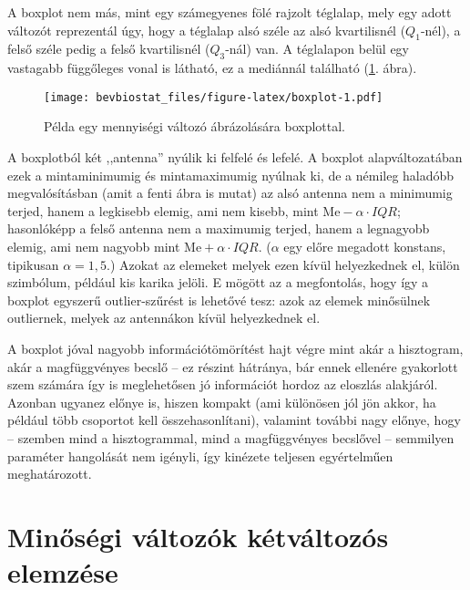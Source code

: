\documentclass[]{book}
\newenvironment{Shaded}{\begin{snugshade}}{\end{snugshade}}
\newcommand{\KeywordTok}[1]{\textcolor[rgb]{0.13,0.29,0.53}{\textbf{#1}}}
\newcommand{\OperatorTok}[1]{\textcolor[rgb]{0.81,0.36,0.00}{\textbf{#1}}}
\newcommand{\NormalTok}[1]{#1}
\begin{document}
A boxplot nem más, mint egy számegyenes fölé rajzolt téglalap, mely egy
adott változót reprezentál úgy, hogy a téglalap alsó széle az alsó
kvartilisnél (\(Q_1\)-nél), a felső széle pedig a felső kvartilisnél
(\(Q_3\)-nál) van. A téglalapon belül egy vastagabb függőleges vonal is
látható, ez a mediánnál található (\ref{fig:boxplot}. ábra).

\begin{Shaded}
\end{Shaded}

\begin{figure}
\centering
\texttt{[image: bevbiostat\_files/figure-latex/boxplot-1.pdf]}
\caption{\label{fig:boxplot}Példa egy mennyiségi változó ábrázolására
boxplottal.}
\end{figure}

A boxplotból két ,,antenna'' nyúlik ki felfelé és lefelé. A boxplot
alapváltozatában ezek a mintaminimumig és mintamaximumig nyúlnak ki, de
a némileg haladóbb megvalósításban (amit a fenti ábra is mutat) az alsó
antenna nem a minimumig terjed, hanem a legkisebb elemig, ami nem
kisebb, mint \(\mathrm{Me}-\alpha \cdot IQR\); hasonlóképp a felső
antenna nem a maximumig terjed, hanem a legnagyobb elemig, ami nem
nagyobb mint \(\mathrm{Me}+\alpha \cdot IQR\). (\(\alpha\) egy előre
megadott konstans, tipikusan \(\alpha=1,\!5\).) Azokat az elemeket
melyek ezen kívül helyezkednek el, külön szimbólum, például kis karika
jelöli. E mögött az a megfontolás, hogy így a boxplot egyszerű
outlier-szűrést is lehetővé tesz: azok az elemek minősülnek outliernek,
melyek az antennákon kívül helyezkednek el.

A boxplot jóval nagyobb információtömörítést hajt végre mint akár a
hisztogram, akár a magfüggvényes becslő -- ez részint hátránya, bár
ennek ellenére gyakorlott szem számára így is meglehetősen jó
információt hordoz az eloszlás alakjáról. Azonban ugyanez előnye is,
hiszen kompakt (ami különösen jól jön akkor, ha például több csoportot
kell összehasonlítani), valamint további nagy előnye, hogy -- szemben
mind a hisztogrammal, mind a magfüggvényes becslővel -- semmilyen
paraméter hangolását nem igényli, így kinézete teljesen egyértelműen
meghatározott.

\section{Minőségi változók kétváltozós
elemzése}\label{deskriptivminketvalt}
\end{document}
